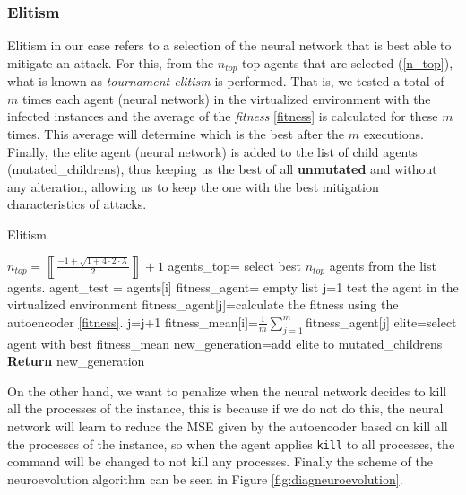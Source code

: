 \documentclass{iosart2c}
\begin{document}
\subsubsection{Elitism}

Elitism in our case refers to a selection of the neural network that is best able to mitigate an attack. For this, from the $n_{top}$ top agents that are selected (\ref{n_top}), what is known as \textit{tournament elitism} is performed. That is, we tested a total of $m$ times each agent (neural network) in the virtualized environment with the infected instances and the average of the \textit{fitness} \ref{fitness} is calculated for these $m$ times. This average will determine which is the best after the $m$ executions. Finally, the elite agent (neural network) is added to the list of child agents (mutated\_childrens), thus keeping us the best of all \textbf{unmutated} and without any alteration, allowing us to keep the one with the best mitigation characteristics of attacks. \\



\begin{algorithm}[h!]
\caption{Elitism}\label{elitismo}
\begin{algorithmic}[1]
\State $n_{top}=\left\llbracket\frac{-1+\sqrt{1+4\cdot2\cdot \lambda}}{2}\right\rrbracket+1$
\State agents\_top= select best $n_{top}$ agents from the list agents.
    \State agent\_test = agents[i]
    \State fitness\_agent= empty list
    \State j=1
    \Repeat
        \State test the agent in the virtualized environment
        \State fitness\_agent[j]=calculate the fitness using \State the autoencoder \ref{fitness}.
        \State j=j+1
\EndFor
\State fitness\_mean[i]=$\frac{1}{m}\sum^m_{j=1}$fitness\_agent[j]
\State elite=select agent with best fitness\_mean
\State new\_generation=add elite to mutated\_childrens
\State \textbf{Return} new\_generation
\EndFunction
\end{algorithmic}
\end{algorithm}

On the other hand, we want to penalize when the neural network decides to kill all the processes of the instance, this is because if we do not do this, the neural network will learn to reduce the MSE given by the autoencoder based on kill all the processes of the instance, so when the agent applies \texttt{kill} to all processes, the command will be changed to not kill any processes. Finally the scheme of the neuroevolution algorithm can be seen in Figure \ref{fig:diagneuroevolution}.
\end{document}
